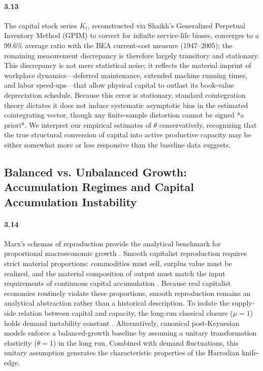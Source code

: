 \paragraph{3.13}
The capital stock series $K_t$, reconstructed via Shaikh’s Generalized Perpetual Inventory Method (GPIM) to correct for infinite service-life biases, converges to a 99.6\% average ratio with the BEA current-cost measure (1947–2005); the remaining measurement discrepancy is therefore largely transitory and stationary. This discrepancy is not mere statistical noise; it reflects the material imprint of workplace dynamics—deferred maintenance, extended machine running times, and labor speed-ups—that allow physical capital to outlast its book-value depreciation schedule. Because this error is stationary, standard cointegration theory dictates it does not induce systematic asymptotic bias in the estimated cointegrating vector, though any finite-sample distortion cannot be signed *a priori*. We interpret our empirical estimates of $\theta$ conservatively, recognizing that the true structural conversion of capital into active productive capacity may be either somewhat more or less responsive than the baseline data suggests.

\subsection{Balanced vs. Unbalanced Growth: Accumulation Regimes and Capital Accumulation Instability}
\label{subsec:balanced_unbalanced_growth}

\paragraph{3.14}
Marx's schemas of reproduction provide the analytical benchmark for proportional macroeconomic growth \citep{Okishio2022}. Smooth capitalist reproduction requires strict material proportions: commodities must sell, surplus value must be realized, and the material composition of output must match the input requirements of continuous capital accumulation \citep{Basu2022}. Because real capitalist economies routinely violate these proportions, smooth reproduction remains an analytical abstraction rather than a historical description. To isolate the supply-side relation between capital and capacity, the long-run classical closure ($\mu = 1$) holds demand instability constant \citep{Foley1985}. Alternatively, canonical post-Keynesian models enforce a balanced-growth baseline by assuming a unitary transformation elasticity ($\theta = 1$) in the long run. Combined with demand fluctuations, this unitary assumption generates the characteristic properties of the Harrodian knife-edge.

